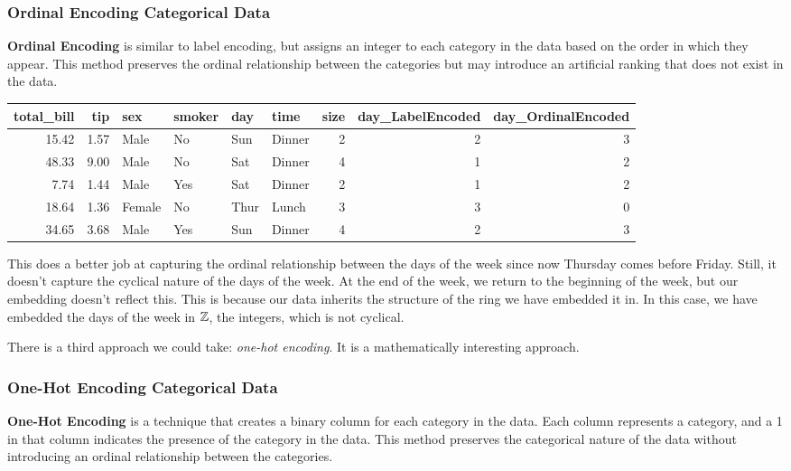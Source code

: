 \subsubsection{{Ordinal Encoding Categorical Data}}

\textbf{Ordinal Encoding} is similar to label encoding, but assigns an integer to each category in the data based on the order in which they appear. This method preserves the ordinal relationship between the categories but may introduce an artificial ranking that does not exist in the data.


\begin{table}[ht]
    \centering 
    \begin{tabular}{rrllllrrr}
        \toprule
        total\_bill & tip & sex & smoker & day & time & size & day\_LabelEncoded & day\_OrdinalEncoded \\
        \midrule
        15.42 & 1.57 & Male & No & Sun & Dinner & 2 & 2 & 3 \\
        48.33 & 9.00 & Male & No & Sat & Dinner & 4 & 1 & 2 \\
        7.74 & 1.44 & Male & Yes & Sat & Dinner & 2 & 1 & 2 \\
        18.64 & 1.36 & Female & No & Thur & Lunch & 3 & 3 & 0 \\
        34.65 & 3.68 & Male & Yes & Sun & Dinner & 4 & 2 & 3 \\
        \bottomrule
    \end{tabular}           
\end{table}

This does a better job at capturing the ordinal relationship between the days of the week since now Thursday comes before Friday. Still, it doesn't capture the cyclical nature of the days of the week. At the end of the week, we return to the beginning of the week, but our embedding doesn't reflect this. This is because our data inherits the structure of the ring we have embedded it in. In this case, we have embedded the days of the week in $\mathbb{Z}$, the integers, which is not cyclical. 
    

There is a third approach we could take: \emph{one-hot encoding}. It is a mathematically interesting approach.

\subsubsection{One-Hot Encoding Categorical Data}
\textbf{One-Hot Encoding} is a technique that creates a binary column for each category in the data. Each column represents a category, and a 1 in that column indicates the presence of the category in the data. This method preserves the categorical nature of the data without introducing an ordinal relationship between the categories.

